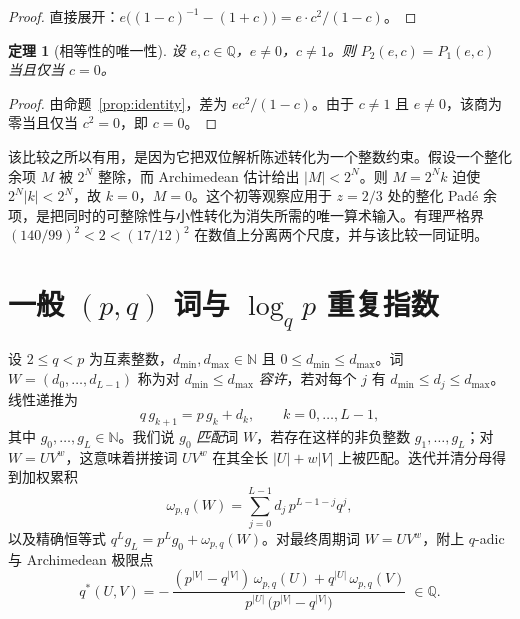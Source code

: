 \documentclass[11pt,a4paper]{article}
\newtheorem{theorem}{定理}[section]
\theoremstyle{remark}
\newcommand{\Q}{\mathbb{Q}}
\newcommand{\N}{\mathbb{N}}
\begin{document}
\begin{proof}
直接展开：$e\bigl((1-c)^{-1} - (1+c)\bigr) = e \cdot c^{2}/(1-c)$。
\end{proof}

\begin{theorem}[相等性的唯一性]
\label{thm:iff}
设 $e, c \in \Q$，$e \neq 0$，$c \neq 1$。则 $P_{2}(e,c) = P_{1}(e,c)$ 当且仅当 $c = 0$。
\end{theorem}

\begin{proof}
由命题~\ref{prop:identity}，差为 $e c^{2}/(1-c)$。由于 $c \neq 1$ 且 $e \neq 0$，该商为零当且仅当 $c^{2} = 0$，即 $c = 0$。
\end{proof}

该比较之所以有用，是因为它把双位解析陈述转化为一个整数约束。假设一个整化余项 $M$ 被 $2^{N}$ 整除，而 Archimedean 估计给出 $|M| < 2^{N}$。则 $M = 2^{N} k$ 迫使 $2^{N}|k| < 2^{N}$，故 $k = 0$，$M = 0$。这个初等观察应用于 $z = 2/3$ 处的整化 Pad\'e 余项，是把同时的可整除性与小性转化为消失所需的唯一算术输入。有理严格界 $(140/99)^{2} < 2 < (17/12)^{2}$ 在数值上分离两个尺度，并与该比较一同证明。

\section{一般 \texorpdfstring{$(p,q)$}{(p,q)} 词与 \texorpdfstring{$\log_q p$}{log\_q p} 重复指数}
\label{sec:pq}

设 $2 \le q < p$ 为互素整数，$d_{\min}, d_{\max} \in \N$ 且 $0 \le d_{\min} \le d_{\max}$。词 $W = (d_{0}, \dots, d_{L-1})$ 称为对 $d_{\min} \le d_{\max}$ \emph{容许}，若对每个 $j$ 有 $d_{\min} \le d_{j} \le d_{\max}$。线性递推为
\begin{equation}
  q\, g_{k+1} = p\, g_{k} + d_{k}, \qquad k = 0, \dots, L-1,
\end{equation}
其中 $g_{0}, \dots, g_{L} \in \N$。我们说 $g_{0}$ \emph{匹配}词 $W$，若存在这样的非负整数 $g_{1}, \dots, g_{L}$；对 $W = U V^{w}$，这意味着拼接词 $U V^{w}$ 在其全长 $|U| + w|V|$ 上被匹配。迭代并清分母得到加权累积
\begin{equation}
  \omega_{p,q}(W) = \sum_{j=0}^{L-1} d_{j}\, p^{L-1-j} q^{j},
\end{equation}
以及精确恒等式 $q^{L} g_{L} = p^{L} g_{0} + \omega_{p,q}(W)$。对最终周期词 $W = U V^{w}$，附上 $q$-adic 与 Archimedean 极限点
\begin{equation}
  q^{*}(U,V) = -\,\frac{(p^{|V|} - q^{|V|})\, \omega_{p,q}(U) + q^{|U|}\, \omega_{p,q}(V)}
    {p^{|U|}\,\bigl(p^{|V|} - q^{|V|}\bigr)} \; \in \Q .
  \label{eq:qstar}
\end{equation}
\end{document}
